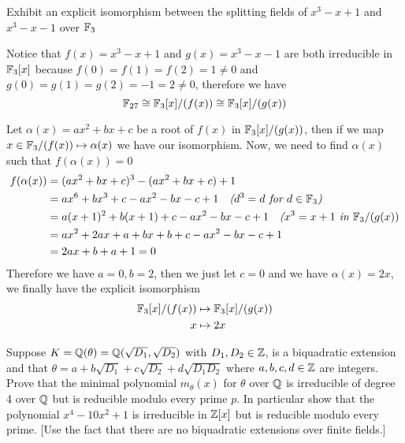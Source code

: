 \begin{exercise}
    Exhibit an explicit isomorphism between the splitting fields of $x^3 - x + 1$ and $x^3 - x - 1$ over $\mathbb{F}_3$
\end{exercise}
\begin{solution}
    Notice that $f(x) = x^3 - x + 1$ and $g(x) = x^3 - x - 1$ are both irreducible in $\mathbb{F}_3[x]$ because $f(0) = f(1) = f(2) = 1 \neq 0$ and $g(0) = g(1) = g(2) = -1 = 2 \neq 0$, therefore we have \[\mathbb{F}_{27} \cong \mathbb{F}_3[x]/(f(x)) \cong \mathbb{F}_3[x]/(g(x))\]

    \noindent Let $\alpha(x) = ax^2 + bx + c$ be a root of $f(x)$ in $\mathbb{F}_3[x]/(g(x))$, then if we map $x \in \mathbb{F}_3/(f(x)) \mapsto \alpha(x)$ we have our isomorphism. Now, we need to find $\alpha(x)$ such that $f(\alpha(x)) = 0$
    \begin{align*}
        f(\alpha(x)) &= (ax^2 + bx + c)^3 - (ax^2 + bx + c) + 1 \\
        &= ax^6 + bx^3 + c - ax^2 - bx - c + 1 \quad \textit{($d^3 = d$ for $d \in \mathbb{F}_3$)} \\
        &= a(x + 1)^2 + b(x + 1) + c - ax^2 - bx - c + 1 \quad \textit{($x^3 = x + 1$ in $\mathbb{F}_3/(g(x))$} \\
        &= ax^2 + 2ax + a + bx + b + c - ax^2 - bx - c + 1 \\
        &= 2ax + b + a + 1 = 0
    \end{align*}
    Therefore we have $a = 0, b = 2$, then we just let $c = 0$ and we have $\alpha(x) = 2x$, we finally have the explicit isomorphism
    \begin{align*}
        \mathbb{F}_3[x]/(f(x)) &\mapsto \mathbb{F}_3[x]/(g(x)) \\
        x &\mapsto 2x
    \end{align*}
\end{solution}

\begin{unfinished}
    Suppose $K = \mathbb{Q}(\theta) = \mathbb{Q}(\sqrt{D_1}, \sqrt{D_2})$ with $D_1, D_2 \in \mathbb{Z}$, is a biquadratic extension and that $\theta = a + b\sqrt{D_1} + c\sqrt{D_2} + d\sqrt{D_1D_2}$ where $a, b, c, d \in \mathbb{Z}$ are integers. Prove that the minimal polynomial $m_{\theta}(x)$ for $\theta$ over $\mathbb{Q}$ is irreducible of degree 4 over $\mathbb{Q}$ but is reducible modulo every prime $p$. In particular show that the polynomial $x^4 - 10x^2 + 1$ is irreducible in $\mathbb{Z}[x]$ but is reducible modulo every prime. [Use the fact that there are no biquadratic extensions over finite fields.]
\end{unfinished}


